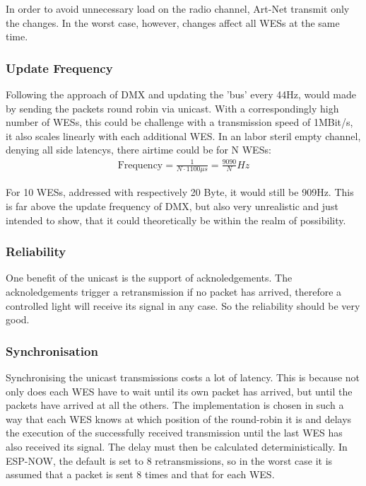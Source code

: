 In order to avoid unnecessary load on the radio channel, Art-Net transmit only the changes.
In the worst case, however, changes affect all WESs at the same time.

\subsubsection*{Update Frequency}
Following the approach of DMX and updating the 'bus' every 44Hz, would made by sending the packets round robin via unicast. 
With a correspondingly high number of WESs, this could be challenge with a transmission speed of 1MBit/s, 
it also scales linearly with each additional WES. 
In an labor steril empty channel, denying all side latencys, there airtime could be for N WESs:
\begin{align}
	\text{Frequency} = \frac{1}{N \cdot 1100\mu s} = \frac{9090}{N} Hz
\end{align}

For 10 WESs, addressed with respectively 20 Byte, it would still be 909Hz.
This is far above the update frequency of DMX, but also very unrealistic and just intended to show,
that it could theoretically be within the realm of possibility.

\subsubsection*{Reliability}

One benefit of the unicast is the support of acknoledgements. 
The acknoledgements trigger a retransmission if no packet has arrived, therefore a controlled light will receive its signal in any case.
So the reliability should be very good.

\subsubsection*{Synchronisation}

Synchronising the unicast transmissions costs a lot of 
latency.
This is because not only does each WES have to wait until its own packet has arrived,
but until the packets have arrived at all the others.
The implementation is chosen in such a way that each WES knows at which position of the round-robin it is
and delays the execution of the successfully received transmission until the last WES has also received its signal.
The delay must then be calculated deterministically.
In ESP-NOW, the default is set to 8 retransmissions, so in the worst case it is assumed that a packet is sent 8 times
and that for each WES.

